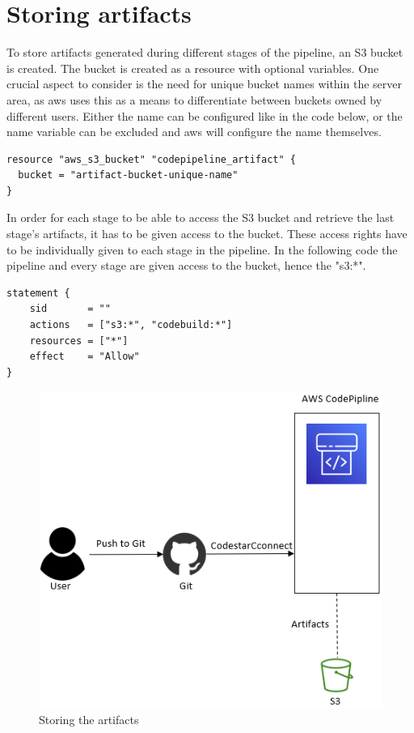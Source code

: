 \section{Storing artifacts}
To store \gls{artifact}s generated during different stages of the pipeline, an S3 bucket is created. The bucket is created as a resource with optional variables. One crucial aspect to consider is the need for unique bucket names within the server area, as \acrshort{aws} uses this as a means to differentiate between buckets owned by different users. Either the name can be configured like in the code below, or the name variable can be excluded and \acrshort{aws} will configure the name themselves.

\begin{tcolorbox}
\begin{verbatim}
resource "aws_s3_bucket" "codepipeline_artifact" {
  bucket = "artifact-bucket-unique-name"
}
\end{verbatim}
\end{tcolorbox}

In order for each stage to be able to access the S3 bucket and retrieve the last stage's \gls{artifact}s, it has to be given access to the bucket. These access rights have to be individually given to each stage in the pipeline. In the following code the pipeline and every stage are given access to the bucket, hence the "s3:*".

\begin{tcolorbox}
\begin{verbatim}
statement {
    sid       = ""
    actions   = ["s3:*", "codebuild:*"]
    resources = ["*"]
    effect    = "Allow"
}
\end{verbatim}
\end{tcolorbox}

\vspace{2mm}
\begin{figure}[H]
    \centering
    \includegraphics[width=0.6\columnwidth]{Images/aws-piplin-2.png}
    \caption{Storing the artifacts}
    \label{fig: Storing the artifacts}
\end{figure}

